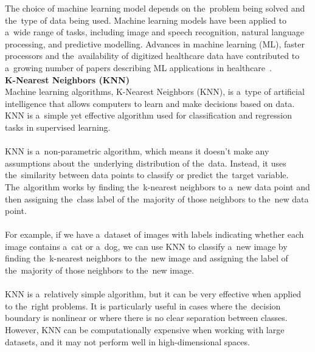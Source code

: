 The choice of machine learning model depends on the~problem being solved and the~type of data being used. Machine
learning models have been applied to a~wide range of tasks, including image and speech recognition, natural language
processing, and predictive modelling. Advances in machine learning (ML), faster processors and the~availability of
digitized healthcare data have contributed to a~growing number of papers describing ML applications in healthcare~\cite{Chen}.\\
\newpage
\noindent \textbf{K-Nearest Neighbors (KNN)} \label{sec:knn}\\
Machine learning algorithms, K-Nearest Neighbors (KNN), is a~type of artificial intelligence that allows
computers to learn and make decisions based on data. KNN is a~simple yet effective algorithm used for
classification and regression tasks in supervised learning.\\
\\
KNN is a~non-parametric algorithm, which means it doesn't make any assumptions about the~underlying
distribution of the~data. Instead, it uses the~similarity between data points to classify or predict the~target
variable. The~algorithm works by finding the~k-nearest neighbors to a~new data point and then assigning the~class
label of the~majority of those neighbors to the~new data point.\\
\\
For example, if we have a~dataset of images with labels indicating whether each image contains a~cat or a~dog,
we can use KNN to classify a~new image by finding the~k-nearest neighbors to the~new image and assigning the
label of the~majority of those neighbors to the~new image.\\
\\
KNN is a~relatively simple algorithm, but it can be very effective when applied to the~right problems.
It is particularly useful in cases where the~decision boundary is nonlinear or where there is no clear
separation between classes. However, KNN can be computationally expensive when working with large datasets, and
it may not perform well in high-dimensional spaces.


